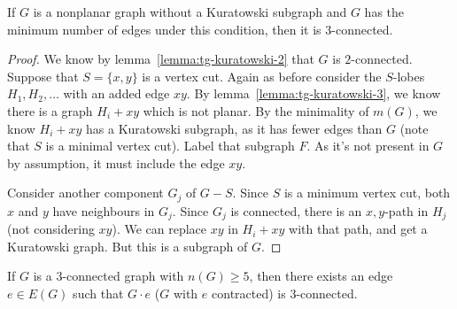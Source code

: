 
\begin{lemma}
  \label{lemma:tg-kuratowski-4}
  If $G$ is a nonplanar graph without a Kuratowski subgraph and $G$ has the
  minimum number of edges under this condition, then it is $3$-connected.
\end{lemma}

\begin{proof}
  We know by lemma~\ref{lemma:tg-kuratowski-2} that $G$ is $2$-connected.
  Suppose that $S = \{x,y\}$ is a vertex cut.
  Again as before consider the $S$-lobes $H_1, H_2, \ldots$ with an added edge
  $xy$.
  By lemma~\ref{lemma:tg-kuratowski-3}, we know there is a graph $H_i + xy$
  which is not planar.
  By the minimality of $m(G)$, we know $H_i + xy$ has a Kuratowski subgraph, as
  it has fewer edges than $G$ (note that $S$ is a minimal vertex cut).
  Label that subgraph $F$.
  As it's not present in $G$ by assumption, it must include the edge $xy$.

  Consider another component $G_j$ of $G - S$.
  Since $S$ is a minimum vertex cut, both $x$ and $y$ have neighbours in $G_j$.
  Since $G_j$ is connected, there is an $x,y$-path in $H_j$ (not considering
  $xy$).
  We can replace $xy$ in $H_i + xy$ with that path, and get a Kuratowski graph.
  But this is a subgraph of $G$.
\end{proof}


\begin{theorem}
  \label{theorem:tg-kuratowski-5}
  If $G$ is a $3$-connected graph with $n(G) \ge 5$, then there exists an edge
  $e \in E(G)$ such that $G \cdot e$ ($G$ with $e$ contracted) is $3$-connected.
\end{theorem}


